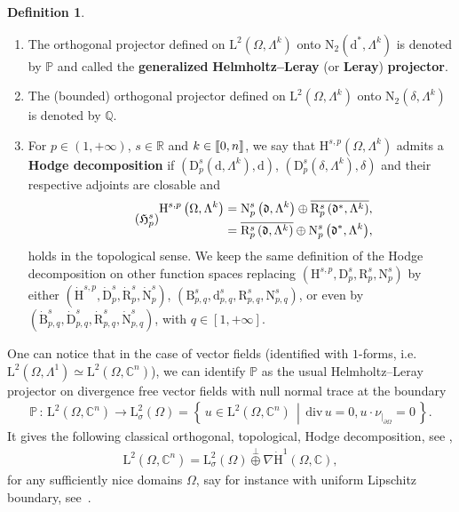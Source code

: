 \documentclass[10pt]{amsart}
\theoremstyle{definition}\newtheorem{defi}[theo]{Definition}\newtheorem{rema}[theo]{Remark}\newtheorem{exam}[theo]{Example}\newtheorem{exem}[theo]{Example}\newtheorem{nota}[theo]{Notation}
\renewcommand*{\div}{\mathrm{div\,}}
\newcommand{\bbP}{\mathbb{P}}
\newcommand{\bbR}{\mathbb{R}}
\newcommand{\bbC}{\mathbb{C}}
\newcommand{\bbQ}{\mathbb{Q}}
\newcommand{\rmH}{\mathrm{H}}%
\newcommand{\rmB}{\mathrm{B}}
\newcommand{\rmd}{\mathrm{d}}
\newcommand{\rmD}{\mathrm{D}}
\newcommand{\rmL}{\mathrm{L}}
\newcommand{\rmR}{\mathrm{R}}
\newcommand{\rmN}{\mathrm{N}}
\newcommand{\fkd}{\mathfrak{d}}
\newcommand{\llbracket}{\mathopen{[\mkern -2.7mu[}}
\newcommand{\rrbracket}{\mathclose{]\mkern -2.7mu]}}
\newcommand{\llb}{\llbracket}
\newcommand{\rrb}{\rrbracket}
\newcommand*{\romanenumi}{\renewcommand*{\theenumi}{\roman{enumi}}}
\begin{document}
\begin{defi}\leavevmode
\begin{enumerate}\romanenumi
\item\label{defi2.4.1} The orthogonal projector defined on $\rmL^2(\Omega,\Lambda^k)$ onto $\rmN _2(\rmd^\ast,\Lambda^k)$ is denoted by $\bbP$ and called the \textbf{generalized} \textbf{Helmholtz}\textbf{--}\textbf{Leray} (or \textbf{Leray}) \textbf{projector}.
\item\label{defi2.4.2} The (bounded) orthogonal projector defined on $\rmL^2(\Omega,\Lambda^k)$ onto $\rmN_2(\delta,\Lambda^k)$ is denoted by $\bbQ$.
\item\label{defi2.4.3} For $p\in(1,+\infty)$, $s\in\bbR$ and $k\in\llb 0,n\rrb$, we say that $\rmH^{s,p}(\Omega,\Lambda^k)$ admits a \textbf{Hodge decomposition} if $(\rmD_p^s(\rmd,\Lambda^k),\rmd)$, $(\rmD_p^s(\delta,\Lambda^k),\delta)$ and their respective adjoints are closable and
\begin{equation}\label{HodgeDecompHsp}
\tag{$\mathfrak{H}_p^s$}
\begin{split}
\rmH^{s,p}\left(\Omega,\Lambda^k\right) &= \rmN_p^s\left(\fkd,\Lambda^k\right)\oplus \overline{\rmR_p^s\left(\fkd^\ast,\Lambda^k\right)},\\
&= \overline{\rmR _p^s\left(\fkd,\Lambda^k\right)} \oplus {\rmN_p^s\left(\fkd^\ast,\Lambda^k\right)},
\end{split}
\end{equation}
holds in the topological sense. We keep the same definition of the Hodge decomposition on other function spaces replacing $({\rmH}^{s,p},{\rmD}_p^s,{\rmR }_p^s,{\rmN }_p^s)$ by either $(\dot{\rmH}^{s,p},\dot{\rmD}_p^s,\dot{\rmR }_p^s,\dot{\rmN }_p^s)$, $({\rmB}^{s}_{p,q},{\rmd}_{p,q}^s,{\rmR }_{p,q}^s,{\rmN }_{p,q}^s)$, or even by $(\dot{\rmB}^{s}_{p,q},\dot{\rmD}_{p,q}^s,\dot{\rmR }_{p,q}^s,\dot{\rmN }_{p,q}^s)$, with $q\in[1,+\infty]$.
\end{enumerate}
\end{defi}

One can notice that in the case of vector fields (identified with $1$-forms, i.e. $\rmL^2(\Omega,\Lambda^1)\simeq \rmL^2(\Omega,\bbC^n)$), we can identify $\bbP$ as the usual Helmholtz--Leray projector on divergence free vector fields with null normal trace at the boundary
\begin{align*}
\bbP\,:\, \rmL^2\left(\Omega,\bbC^n\right) \longrightarrow \rmL^2_{\sigma}(\Omega)=
\left\{\, u\in \rmL^2\left(\Omega,\bbC^n\right)\,\middle|\, \div u = 0, u\cdot
\nu_{|_{\partial\Omega}} =0\,\right\}.
\end{align*}
It gives the following classical orthogonal, topological, Hodge decomposition, see \cite[Chapter~2,~Section~2.5]{SohrBook2001},
\begin{align*}
\rmL^2\left(\Omega,\bbC^n\right)= \rmL^2_{\sigma}(\Omega)\stackrel{\perp}{\oplus}\nabla \dot{\rmH}^1(\Omega,\bbC),
\end{align*}
for any sufficiently nice domains $\Omega$, say for instance with uniform Lipschitz boundary, see~\cite[Lemma~2.5.3]{SohrBook2001}.
\end{document}

